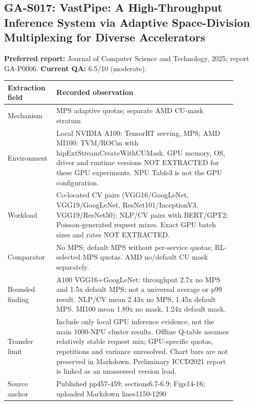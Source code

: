 \subsection{GA-S017: VastPipe: A High-Throughput Inference System via Adaptive Space-Division Multiplexing for Diverse Accelerators}
\textbf{Preferred report:} Journal of Computer Science and Technology, 2025; report GA-P0006. \textbf{Current QA:} 6.5/10 (moderate).
\begin{longtable}{P{0.15\linewidth}P{0.75\linewidth}}
\toprule Extraction field & Recorded observation\\\midrule\endhead
Mechanism & MPS adaptive quotas; separate AMD CU-mask stratum\\
Environment & Local NVIDIA A100: TensorRT serving, MPS; AMD MI100: TVM/ROCm with hipExtStreamCreateWithCUMask. GPU memory, OS, driver and runtime versions NOT EXTRACTED for these GPU experiments. NPU Table3 is not the GPU configuration.\\
Workload & Co-located CV pairs (VGG16/GoogLeNet, VGG19/GoogLeNet, ResNet101/InceptionV3, VGG19/ResNet50); NLP/CV pairs with BERT/GPT2; Poisson-generated request mixes. Exact GPU batch sizes and rates NOT EXTRACTED.\\
Comparator & No MPS; default MPS without per-service quotas; RL-selected MPS quotas. AMD no/default CU mask separately.\\
Bounded finding & A100 VGG16+GoogLeNet: throughput 2.7x no MPS and 1.5x default MPS; not a universal average or p99 result. NLP/CV mean 2.43x no MPS, 1.45x default MPS. MI100 mean 1.89x no mask, 1.24x default mask.\\
Transfer limit & Include only local GPU inference evidence, not the main 1000-NPU cluster results. Offline Q-table assumes relatively stable request mix; GPU-specific quotas, repetitions and variance unresolved. Chart bars are not preserved in Markdown. Preliminary ICCD2021 report is linked as an unassessed version lead.\\
Source anchor & Published pp457-459; sections6.7-6.9; Figs14-16; uploaded Markdown lines1150-1290\\
\bottomrule\end{longtable}

